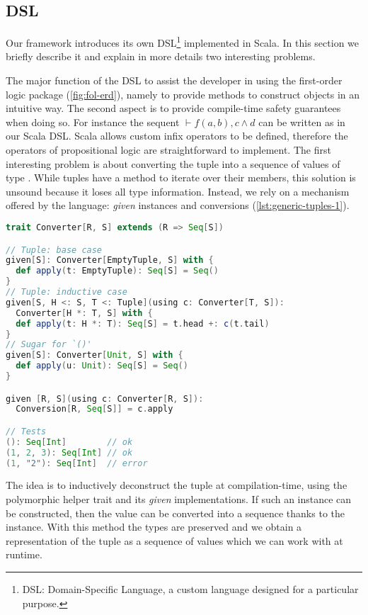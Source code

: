 \subsection{DSL}

Our framework introduces its own DSL\footnote{DSL: Domain-Specific Language, a custom language designed for a particular purpose.} implemented in Scala. In this section we briefly describe it and explain in more details two interesting problems.



The major function of the DSL to assist the developer in using the first-order logic package (\autoref{fig:fol-erd}), namely to provide methods to construct objects in an intuitive way. The second aspect is to provide compile-time safety guarantees when doing so. For instance the sequent $\vdash f(a, b), c \land d$ can be written as  in our Scala DSL. Scala allows custom infix operators to be defined, therefore the operators of propositional logic are straightforward to implement. The first interesting problem is about converting the tuple  into a sequence of values of type . While tuples have a method to iterate over their members, this solution is unsound because it loses all type information. Instead, we rely on a mechanism offered by the language: \textit{given} instances and conversions (\autoref{lst:generic-tuples-1}).

\begin{lstlisting}[language=Scala,caption={[Generic tuples (1)]{Generic tuples: converting a tuple of \code{T} into a \code{Seq[T]}.}},label={lst:generic-tuples-1}]
trait Converter[R, S] extends (R => Seq[S])

// Tuple: base case
given[S]: Converter[EmptyTuple, S] with {
  def apply(t: EmptyTuple): Seq[S] = Seq()
}
// Tuple: inductive case
given[S, H <: S, T <: Tuple](using c: Converter[T, S]):
  Converter[H *: T, S] with {
  def apply(t: H *: T): Seq[S] = t.head +: c(t.tail)
}
// Sugar for `()'
given[S]: Converter[Unit, S] with {
  def apply(u: Unit): Seq[S] = Seq()
}

given [R, S](using c: Converter[R, S]):
  Conversion[R, Seq[S]] = c.apply

// Tests
(): Seq[Int]        // ok
(1, 2, 3): Seq[Int] // ok
(1, "2"): Seq[Int]  // error
\end{lstlisting}

The idea is to inductively deconstruct the tuple at compilation-time, using the polymorphic helper trait  and its \textit{given} implementations. If such an instance can be constructed, then the value can be converted into a sequence thanks to the  instance. With this method the types are preserved and we obtain a representation of the tuple as a sequence of values which we can work with at runtime.

